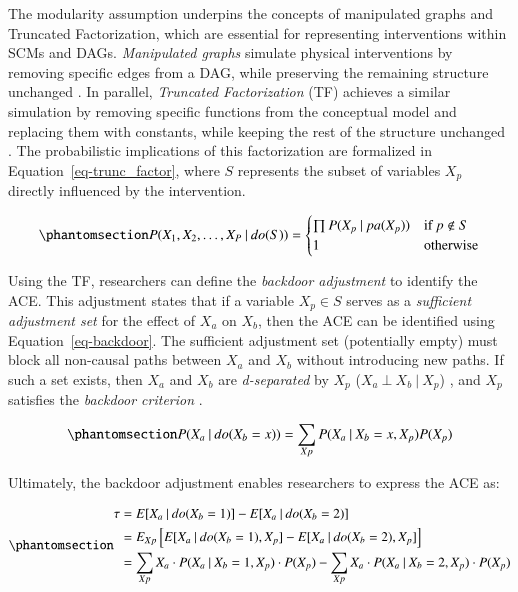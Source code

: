 \documentclass[
  authoryear,
  review,
  1p]{elsarticle}
\begin{document}
The modularity assumption underpins the concepts of manipulated graphs
and Truncated Factorization, which are essential for representing
interventions within SCMs and DAGs. \emph{Manipulated graphs} simulate
physical interventions by removing specific edges from a DAG, while
preserving the remaining structure unchanged \citep[pp.~34]{Neal_2020}.
In parallel, \emph{Truncated Factorization} (TF) achieves a similar
simulation by removing specific functions from the conceptual model and
replacing them with constants, while keeping the rest of the structure
unchanged \citep{Pearl_2010}. The probabilistic implications of this
factorization are formalized in Equation~\ref{eq-trunc_factor}, where
\(S\) represents the subset of variables \(X_{p}\) directly influenced
by the intervention.

\begin{equation}\phantomsection\label{eq-trunc_factor}{
P(X_{1}, X_{2}, \dots, X_{P} \:|\:do(S)) =
\begin{cases}
  \prod P(X_{p} \:|\:pa(X_{p}) ) & \text{if} \: p \not\in S \\
  1 \quad & \text{otherwise}
\end{cases}
}\end{equation}

Using the TF, researchers can define the \emph{backdoor adjustment} to
identify the ACE. This adjustment states that if a variable
\(X_{p} \in S\) serves as a \emph{sufficient adjustment set} for the
effect of \(X_{a}\) on \(X_{b}\), then the ACE can be identified using
Equation~\ref{eq-backdoor}. The sufficient adjustment set (potentially
empty) must block all non-causal paths between \(X_{a}\) and \(X_{b}\)
without introducing new paths. If such a set exists, then \(X_{a}\) and
\(X_{b}\) are \emph{d-separated} by \(X_{p}\)
(\(X_{a} \:\bot\:X_{b} \:|\:X_{p}\)) \citep{Pearl_2009}, and \(X_{p}\)
satisfies the \emph{backdoor criterion} \citep[pp.~37]{Neal_2020}.

\begin{equation}\phantomsection\label{eq-backdoor}{
P(X_{a} \:|\:do(X_{b}=x)) = \sum_{Xp} P(X_{a} \:|\:X_{b}=x, X_{p}) P(X_{p})
}\end{equation}

Ultimately, the backdoor adjustment enables researchers to express the
ACE as:

\begin{equation}\phantomsection\label{eq-backdoor_adjustment}{
\begin{aligned}
\tau & = E[X_{a} \:|\:do(X_{b}=1)]- E[X_{a} \:|\:do(X_{b}=2)] \\
  & = E_{Xp}\left[ E[X_{a} \:|\:do(X_{b}=1), X_{p}]- E[X_{a} \:|\:do(X_{b}=2), X_{p}] \right] \\
  & = \sum_{Xp} X_{a} \cdot P(X_{a} \:|\:X_{b}=1, X_{p}) \cdot P(X_{p}) - \sum_{Xp} X_{a} \cdot P(X_{a} \:|\:X_{b}=2, X_{p}) \cdot P(X_{p})
\end{aligned}
}\end{equation}
\end{document}
